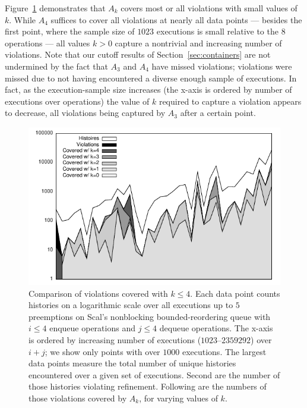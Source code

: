 Figure~\ref{fig:data:coverage} demonstrates that $A_k$ covers most or all
violations with small values of $k$. While $A_4$ suffices to cover all
violations at nearly all data points --- besides the first point, where the
sample size of $1023$ executions is small relative to the $8$ operations ---
all values $k > 0$ capture a nontrivial and increasing number of violations.
Note that our cutoff results of Section~\ref{sec:containers} are not undermined
by the fact that $A_3$ and $A_4$ have missed violations; violations were missed
due to not having encountered a diverse enough sample of executions. In fact,
as the execution-sample size increases (the x-axis is ordered by number of
executions over operations) the value of $k$ required to capture a violation
appears to decrease, all violations being captured by $A_3$ after a certain
point.


\begin{figure}[t]
  \centering
  \includegraphics[width=\linewidth]{figures/coverage-bkq-2-barriers}
  \caption{Comparison of violations covered with
    $k \le 4$. Each data point counts histories on a logarithmic scale over
    all executions up to $5$ preemptions on Scal's nonblocking
    bounded-reordering queue with $i \le 4$ enqueue operations and $j \le 4$
    dequeue operations. The x-axis is ordered by increasing number of
    executions ($1023$--$2359292$) over $i\!+\!j$; we show only points with over
    $1000$ executions. The largest data points measure the total
    number of unique histories encountered over a given set of executions.
    Second are the number of those histories violating refinement.
    Following are the
    numbers of those violations covered by $A_k$, for varying values of $k$.
  }
  \label{fig:data:coverage}
  \vspace{-3mm}
\end{figure}

